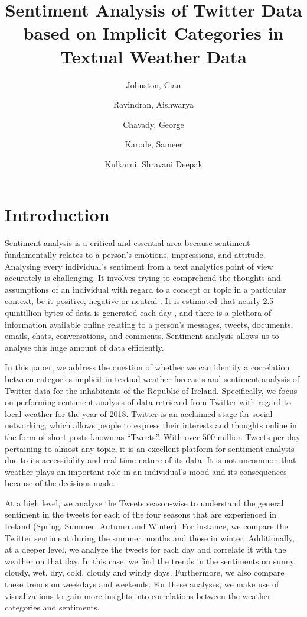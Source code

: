 \documentclass[a4paper,10pt]{article}
\begin{document}
    \title{Sentiment Analysis of Twitter Data based on Implicit Categories in Textual Weather Data}
    \author{
        Johnston, Cian
        \and
        Ravindran, Aishwarya
        \and
        Chavady, George
        \and
        Karode, Sameer
        \and
        Kulkarni, Shravani Deepak
    }

    \maketitle
    \section{Introduction}

    Sentiment analysis is a critical and essential area because sentiment fundamentally relates to a person’s emotions, impressions, and attitude. Analysing every individual’s sentiment from a text analytics point of view accurately is challenging. It involves trying to comprehend the thoughts and assumptions of an individual with regard to a concept or topic in a particular context, be it positive, negative or neutral . It is estimated that nearly 2.5 quintillion bytes of data is generated each day , and there is a plethora of information available online relating to a person’s messages, tweets, documents, emails, chats, conversations, and comments. Sentiment analysis allows us to analyse this huge amount of data efficiently.

    
    In this paper, we address the question of whether we can identify a correlation between categories implicit in textual weather forecasts and sentiment analysis of Twitter data for the inhabitants of the Republic of Ireland. Specifically, we focus on performing sentiment analysis of data retrieved from Twitter  with regard to local weather for the year of 2018. 
    Twitter is an acclaimed stage for social networking, which allows people to express their interests and thoughts online in the form of short posts known as “Tweets”. With over 500 million Tweets per day pertaining to almost any topic, it is an excellent platform for sentiment analysis due to its accessibility and real-time nature of its data. It is not uncommon that weather plays an important role in an individual’s mood and its consequences because of the decisions made. 
    
    At a high level, we analyze the Tweets season-wise to understand the general sentiment in the tweets for each of the four seasons that are experienced in Ireland (Spring, Summer, Autumn and Winter). For instance, we compare the Twitter sentiment during the summer months and those in winter. Additionally, at a deeper level, we analyze the tweets for each day and correlate it with the weather on that day. In this case, we find the trends in the sentiments on sunny, cloudy, wet, dry, cold, cloudy and windy days. Furthermore, we also compare these trends on weekdays and weekends. For these analyses, we make use of visualizations to gain more insights into correlations between the weather categories and sentiments.
\end{document}
